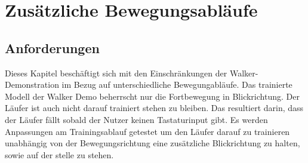 \section{Zusätzliche Bewegungsabläufe}
\subsection{Anforderungen}
Dieses Kapitel beschäftigt sich mit den Einschränkungen der Walker-Demonstration im Bezug auf unterschiedliche Bewegungabläufe. Das trainierte Modell der Walker Demo beherrscht nur die Fortbewegung in Blickrichtung. Der Läufer ist auch nicht darauf trainiert stehen zu bleiben. Das resultiert darin, dass der Läufer fällt sobald der Nutzer keinen Tastaturinput gibt. Es werden Anpassungen am Trainingsablauf getestet um den Läufer darauf zu trainieren unabhängig von der Bewegungsrichtung eine zusätzliche Blickrichtung zu halten, sowie auf der stelle zu stehen. 



